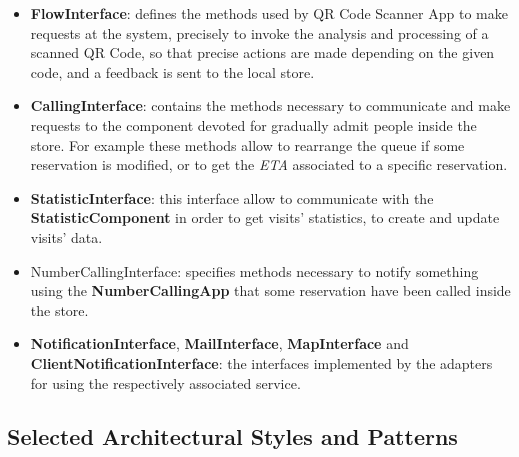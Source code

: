 \documentclass{article}
\begin{document}
\begin{itemize}
		\item{\bfseries FlowInterface}: defines the methods used by QR Code Scanner App to make requests at the system, precisely to invoke the analysis and processing of a scanned QR Code, so that precise actions are made depending on the given code, and a feedback is sent to the local store.
		\item{\bfseries CallingInterface}: contains the methods necessary to communicate and make requests to the component devoted for gradually admit people inside the store. For example these methods allow to rearrange the queue if some reservation is modified, or to get the \emph{ETA} associated to a specific reservation.
		\item{\bfseries StatisticInterface}: this interface allow to communicate with the {\bfseries StatisticComponent} in order to get visits' statistics, to create and update visits' data.
		\item{NumberCallingInterface}: specifies methods necessary to notify something using the {\bfseries NumberCallingApp} that some reservation have been called inside the store.
		\item{\bfseries NotificationInterface}, {\bfseries MailInterface}, {\bfseries MapInterface} and {\bfseries ClientNotificationInterface}: the interfaces implemented by the adapters for using the respectively associated service.
		
		
		
	\end{itemize}
	\subsection{Selected Architectural Styles and Patterns}
\end{document}
